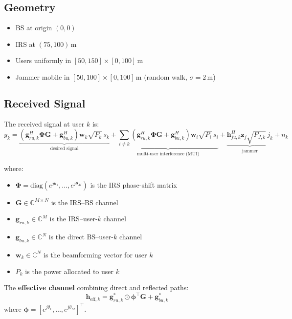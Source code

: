 \documentclass[11pt,a4paper]{article}
\begin{document}
\subsection{Geometry}

\begin{itemize}[nosep]
    \item BS at origin $(0, 0)$
    \item IRS at $(75, 100)$\,m
    \item Users uniformly in $[50,150] \times [0,100]$\,m
    \item Jammer mobile in $[50,100] \times [0,100]$\,m (random walk, $\sigma = 2$\,m)
\end{itemize}

\subsection{Received Signal}

The received signal at user $k$ is:
\begin{equation}
y_k = \underbrace{\left(\mathbf{g}_{ru,k}^H \boldsymbol{\Phi} \mathbf{G} + \mathbf{g}_{bu,k}^H\right) \mathbf{w}_k \sqrt{P_k}\, s_k}_{\text{desired signal}}
+ \underbrace{\sum_{i \neq k} \left(\mathbf{g}_{ru,k}^H \boldsymbol{\Phi} \mathbf{G} + \mathbf{g}_{bu,k}^H\right) \mathbf{w}_i \sqrt{P_i}\, s_i}_{\text{multi-user interference (MUI)}}
+ \underbrace{\mathbf{h}_{ju,k}^H \mathbf{z}_j \sqrt{P_{J,k}}\, j_k}_{\text{jammer}} + n_k
\end{equation}

where:
\begin{itemize}[nosep]
    \item $\boldsymbol{\Phi} = \mathrm{diag}\!\left(e^{j\theta_1}, \ldots, e^{j\theta_M}\right)$ is the IRS phase-shift matrix
    \item $\mathbf{G} \in \mathbb{C}^{M \times N}$ is the IRS--BS channel
    \item $\mathbf{g}_{ru,k} \in \mathbb{C}^{M}$ is the IRS--user-$k$ channel
    \item $\mathbf{g}_{bu,k} \in \mathbb{C}^{N}$ is the direct BS--user-$k$ channel
    \item $\mathbf{w}_k \in \mathbb{C}^{N}$ is the beamforming vector for user $k$
    \item $P_k$ is the power allocated to user $k$
\end{itemize}

The \textbf{effective channel} combining direct and reflected paths:
\begin{equation}\label{eq:heff}
\mathbf{h}_{\mathrm{eff},k} = \mathbf{g}_{ru,k}^* \odot \boldsymbol{\phi}^\top \mathbf{G} + \mathbf{g}_{bu,k}^*
\end{equation}
where $\boldsymbol{\phi} = [e^{j\theta_1}, \ldots, e^{j\theta_M}]^\top$.
\end{document}
